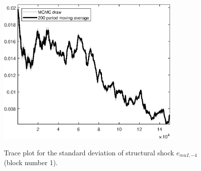 \begin{figure}[H]
\centering
  \includegraphics[width=0.8\textwidth]{BRS_sectoral_wo_gmf/graphs/TracePlot_SE_e_muI_news_blck_1}\\
    \caption{Trace plot for the standard deviation of structural shock ${e_{muI,-4}}$ (block number 1).}
\end{figure}
